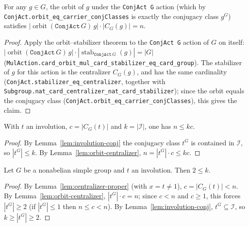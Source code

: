 \begin{lemma}
    \label{lem:orbit-centralizer}
    \leanok
    For any $g \in G$, the orbit of $g$ under the \texttt{ConjAct G} action
    (which by \texttt{ConjAct.orbit\_eq\_carrier\_conjClasses} is exactly the
    conjugacy class $g^G$) satisfies
    $|\operatorname{orbit}(\texttt{ConjAct}\,G)\,g| \cdot |C_G(g)| = n$.
\end{lemma}
\begin{proof}
    Apply the orbit--stabilizer theorem to the \texttt{ConjAct G} action of $G$
    on itself: $|\operatorname{orbit}(\texttt{ConjAct}\,G)\,g| \cdot
    |\operatorname{stab}_{\texttt{ConjAct}\,G}(g)| = |G|$
    (\texttt{MulAction.card\_orbit\_mul\_card\_stabilizer\_eq\_card\_group}). The
    stabilizer of $g$ for this action is the centralizer $C_G(g)$, and has the
    same cardinality
    (\texttt{ConjAct.stabilizer\_eq\_centralizer}, together with
    \texttt{Subgroup.nat\_card\_centralizer\_nat\_card\_stabilizer}); since the
    orbit equals the conjugacy class
    (\texttt{ConjAct.orbit\_eq\_carrier\_conjClasses}), this gives the claim.
\end{proof}

\begin{lemma}
    \label{lem:many-involutions}
    \leanok
    With $t$ an involution, $c = |C_G(t)|$ and $k = |\mathcal{I}|$, one has
    $n \le k c$.
\end{lemma}
\begin{proof}
    By Lemma~\ref{lem:involution-conj} the conjugacy class $t^G$ is contained in
    $\mathcal{I}$, so $|t^G| \le k$. By Lemma~\ref{lem:orbit-centralizer},
    $n = |t^G| \cdot c \le k c$.
\end{proof}

\begin{lemma}
    \label{lem:two-le-k}
    \leanok
    Let $G$ be a nonabelian simple group and $t$ an involution. Then
    $2 \le k$.
\end{lemma}
\begin{proof}
    By Lemma~\ref{lem:centralizer-proper} (with $x = t \ne 1$), $c = |C_G(t)| < n$.
    By Lemma~\ref{lem:orbit-centralizer}, $|t^G| \cdot c = n$; since $c < n$ and
    $c \ge 1$, this forces $|t^G| \ge 2$ (if $|t^G| \le 1$ then $n \le c < n$).
    By Lemma~\ref{lem:involution-conj}, $t^G \subseteq \mathcal{I}$, so
    $k \ge |t^G| \ge 2$.
\end{proof}

